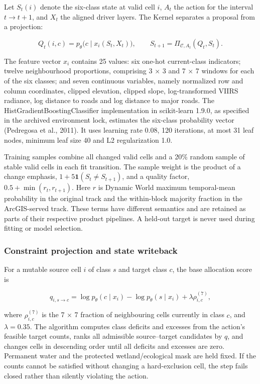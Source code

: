 Let \(S_t(i)\) denote the six-class state at valid cell \(i\), \(A_t\)
the action for the interval \(t\rightarrow t+1\), and \(X_t\) the
aligned driver layers. The Kernel separates a proposal from a
projection:

\[
Q_t(i,c)=p_\theta\big(c\mid x_i(S_t,X_t)\big),
\qquad
S_{t+1}=\Pi_{\mathcal C,A_t}(Q_t,S_t).
\]

The feature vector \(x_i\) contains 25 values: six one-hot current-class
indicators; twelve neighbourhood proportions, comprising 3 × 3 and 7 × 7
windows for each of the six classes; and seven continuous variables,
namely normalized row and column coordinates, clipped elevation, clipped
slope, log-transformed VIIRS radiance, log distance to roads and log
distance to major roads. The HistGradientBoostingClassifier
implementation in scikit-learn 1.9.0, as specified in the archived
environment lock, estimates the six-class probability vector (Pedregosa
et al., 2011). It uses learning rate 0.08, 120 iterations, at most 31
leaf nodes, minimum leaf size 40 and L2 regularization 1.0.

Training samples combine all changed valid cells and a 20\% random
sample of stable valid cells in each fit transition. The sample weight
is the product of a change emphasis, \(1+5\mathbf{1}(S_t\ne S_{t+1})\),
and a quality factor, \(0.5+\min(r_t,r_{t+1})\). Here \(r\) is Dynamic
World maximum temporal-mean probability in the original track and the
within-block majority fraction in the ArcGIS-served track. These terms
have different semantics and are retained as parts of their respective
product pipelines. A held-out target is never used during fitting or
model selection.

\subsubsection{Constraint projection and state
writeback}\label{constraint-projection-and-state-writeback}

For a mutable source cell \(i\) of class \(s\) and target class \(c\),
the base allocation score is

\[
q_{i,s\rightarrow c}=\log p_\theta(c\mid x_i)-\log p_\theta(s\mid x_i)+\lambda\rho^{(7)}_{i,c},
\]

where \(\rho^{(7)}_{i,c}\) is the 7 × 7 fraction of neighbouring cells
currently in class \(c\), and \(\lambda=0.35\). The algorithm computes
class deficits and excesses from the action's feasible target counts,
ranks all admissible source--target candidates by \(q\), and changes
cells in descending order until all deficits and excesses are zero.
Permanent water and the protected wetland/ecological mask are held
fixed. If the counts cannot be satisfied without changing a
hard-exclusion cell, the step fails closed rather than silently
violating the action.

